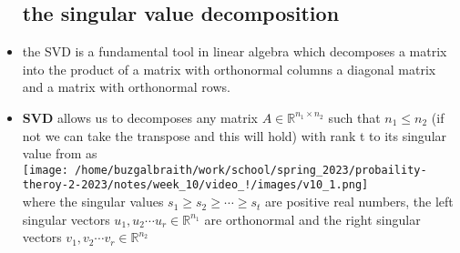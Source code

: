 \documentclass{article}
\begin{document}
\begin{itemize}
\subsection*{the singular value decomposition }
\item the SVD is a fundamental tool in linear algebra which decomposes a matrix into the product of a matrix with orthonormal columns
a diagonal matrix and a matrix with orthonormal rows. 
\item \textbf{SVD} allows us to decomposes any matrix $A\in \mathbb{R}^{n_1\times n_2}$ such that $n_1\leq n_2$ (if not we can 
take the transpose and this will hold) with rank t to its singular value from as \\
\texttt{[image: /home/buzgalbraith/work/school/spring\_2023/probaility-theroy-2-2023/notes/week\_10/video\_!/images/v10\_1.png]}
\\ where  the singular values $s_1\geq s_2 \geq \cdots \geq s_t$ are positive real numbers, the left singular vectors
$u_1,u_2\cdots u_r\in \mathbb{R}^{n_1}$ are orthonormal and the right singular vectors $v_1,v_2\cdots v_r\in \mathbb{R}^{n_2}$


\end{itemize}
\end{document}
